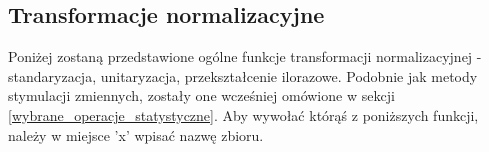 \documentclass[12pt,a4paper]{report}
\begin{document}
\subsection{Transformacje normalizacyjne}
Poniżej zostaną przedstawione ogólne funkcje transformacji normalizacyjnej - standaryzacja, unitaryzacja, przekształcenie ilorazowe. Podobnie jak metody stymulacji zmiennych, zostały one wcześniej omówione w sekcji \ref{wybrane_operacje_statystyczne}. Aby wywołać którąś z poniższych funkcji, należy w miejsce 'x' wpisać nazwę zbioru.

{
\newcommand{\VerbBar}{|}
\newcommand{\VERB}{\Verb[commandchars=\\\{\}]}

\newenvironment{Shaded}{\begin{snugshade}}{\end{snugshade}}
\newcommand{\KeywordTok}[1]{\textcolor[rgb]{0.13,0.29,0.53}{\textbf{{#1}}}}
\newcommand{\DataTypeTok}[1]{\textcolor[rgb]{0.13,0.29,0.53}{{#1}}}
\newcommand{\DecValTok}[1]{\textcolor[rgb]{0.00,0.00,0.81}{{#1}}}
\newcommand{\BaseNTok}[1]{\textcolor[rgb]{0.00,0.00,0.81}{{#1}}}
\newcommand{\FloatTok}[1]{\textcolor[rgb]{0.00,0.00,0.81}{{#1}}}
\newcommand{\ConstantTok}[1]{\textcolor[rgb]{0.00,0.00,0.00}{{#1}}}
\newcommand{\CharTok}[1]{\textcolor[rgb]{0.31,0.60,0.02}{{#1}}}
\newcommand{\SpecialCharTok}[1]{\textcolor[rgb]{0.00,0.00,0.00}{{#1}}}
\newcommand{\StringTok}[1]{\textcolor[rgb]{0.31,0.60,0.02}{{#1}}}
\newcommand{\VerbatimStringTok}[1]{\textcolor[rgb]{0.31,0.60,0.02}{{#1}}}
\newcommand{\SpecialStringTok}[1]{\textcolor[rgb]{0.31,0.60,0.02}{{#1}}}
\newcommand{\ImportTok}[1]{{#1}}
\newcommand{\CommentTok}[1]{\textcolor[rgb]{0.56,0.35,0.01}{\textit{{#1}}}}
\newcommand{\DocumentationTok}[1]{\textcolor[rgb]{0.56,0.35,0.01}{\textbf{\textit{{#1}}}}}
\newcommand{\AnnotationTok}[1]{\textcolor[rgb]{0.56,0.35,0.01}{\textbf{\textit{{#1}}}}}
\newcommand{\CommentVarTok}[1]{\textcolor[rgb]{0.56,0.35,0.01}{\textbf{\textit{{#1}}}}}
\newcommand{\OtherTok}[1]{\textcolor[rgb]{0.56,0.35,0.01}{{#1}}}
\newcommand{\FunctionTok}[1]{\textcolor[rgb]{0.00,0.00,0.00}{{#1}}}
\newcommand{\VariableTok}[1]{\textcolor[rgb]{0.00,0.00,0.00}{{#1}}}
\newcommand{\ControlFlowTok}[1]{\textcolor[rgb]{0.13,0.29,0.53}{\textbf{{#1}}}}
\newcommand{\OperatorTok}[1]{\textcolor[rgb]{0.81,0.36,0.00}{\textbf{{#1}}}}
\newcommand{\BuiltInTok}[1]{{#1}}
\newcommand{\ExtensionTok}[1]{{#1}}
\newcommand{\PreprocessorTok}[1]{\textcolor[rgb]{0.56,0.35,0.01}{\textit{{#1}}}}
\newcommand{\AttributeTok}[1]{\textcolor[rgb]{0.77,0.63,0.00}{{#1}}}
\newcommand{\RegionMarkerTok}[1]{{#1}}
\newcommand{\InformationTok}[1]{\textcolor[rgb]{0.56,0.35,0.01}{\textbf{\textit{{#1}}}}}
\newcommand{\WarningTok}[1]{\textcolor[rgb]{0.56,0.35,0.01}{\textbf{\textit{{#1}}}}}
\newcommand{\AlertTok}[1]{\textcolor[rgb]{0.94,0.16,0.16}{{#1}}}
\newcommand{\ErrorTok}[1]{\textcolor[rgb]{0.64,0.00,0.00}{\textbf{{#1}}}}
\newcommand{\NormalTok}[1]{{#1}}



}
\end{document}
